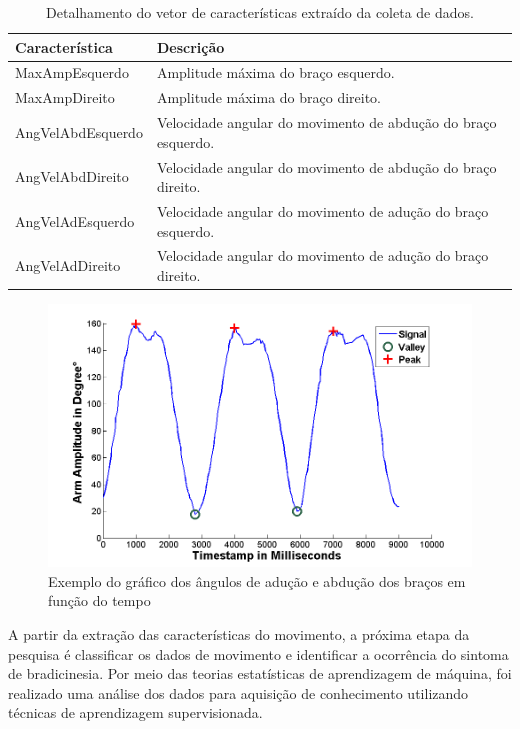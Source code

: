 \begin{table}[h]
\centering
\caption{Detalhamento do vetor de características extraído da coleta de dados.}
\label{table:features}
\begin{tabular}{|l|l|}
\hline
{\bf Característica}  & {\bf Descrição}                                       \\ \hline
MaxAmpEsquerdo     & Amplitude máxima do braço esquerdo. \\ \hline
MaxAmpDireito    & Amplitude máxima do braço direito. \\ \hline
AngVelAbdEsquerdo  & Velocidade angular do movimento de abdução do braço esquerdo. \\ \hline
AngVelAbdDireito & Velocidade angular do movimento de abdução do braço direito. \\ \hline
AngVelAdEsquerdo  & Velocidade angular do movimento de adução do braço esquerdo. \\ \hline
AngVelAdDireito & Velocidade angular do movimento de adução do braço direito. \\ \hline
\end{tabular}
\end{table}

\begin{figure}[!htb]
	\centering
	\includegraphics[width=1\textwidth]{img/signalamplitudepeakvaley-2.png}
	\caption{Exemplo do gráfico dos ângulos de adução e abdução dos braços em função do tempo}
	\label{fig:signalamplitudepeakvaley}
\end{figure}

A partir da extração das características do movimento, a próxima etapa da pesquisa é classificar os dados de movimento e identificar a ocorrência do sintoma de bradicinesia. Por meio das teorias estatísticas de aprendizagem de máquina, foi realizado uma análise dos dados para aquisição de conhecimento utilizando técnicas de aprendizagem supervisionada. 


